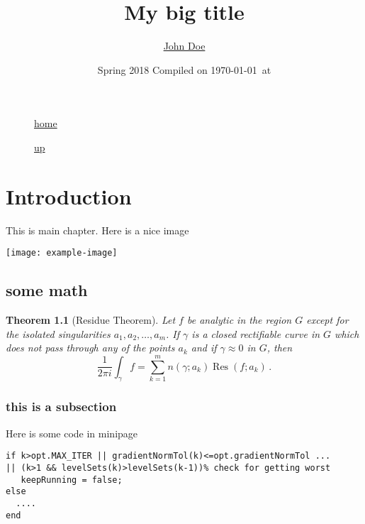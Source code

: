 \documentclass[11pt]{book}
\makeatletter
\newcommand{\authorMe}[0]
 {\author{\footnotesize \href{mailto:user@comain}{John Doe}}}%
\newtheorem{theorem}{Theorem}
\DeclareMathOperator{\Res}{Res}
\makeatother
\begin{document}
   

\begin{description}
\item[] \href{/index.htm}{home}
\item[] \href{../index.htm}{up}
\end{description}

\title{My big title}
\authorMe
\date{Spring 2018 \hspace{.2in} \tiny{Compiled on \today\ at \currenttime}}
\maketitle  

\tableofcontents 

\chapter{Introduction} 
This is main chapter. Here is a nice image

\texttt{[image: example-image]}

\section{some math}

\blindtext
\pagestyle{empty}
\begin{theorem}[Residue Theorem]
Let $f$ be analytic in the region $G$ except for the isolated 
singularities $a_1,a_2,\dots,a_m$. If $\gamma$ is a closed 
rectifiable curve in $G$ which does not pass through any of the 
points $a_k$ and if $\gamma\approx 0$ in $G$, then
\[
  \frac{1}{2\pi i}\int_\gamma\! f = \sum_{k=1}^m 
  n(\gamma;a_k)\Res(f;a_k)\,.
\]
\end{theorem}

\subsection{this is a subsection}

Here is some code in minipage

\begin{minipage}{0.9\textwidth}
\begin{lstlisting}[basicstyle=\footnotesize]
%check if we converged or not
if k>opt.MAX_ITER || gradientNormTol(k)<=opt.gradientNormTol ...
|| (k>1 && levelSets(k)>levelSets(k-1))% check for getting worst
   keepRunning = false;
else
  ....
end
\end{lstlisting}
\end{minipage}
\end{document}
